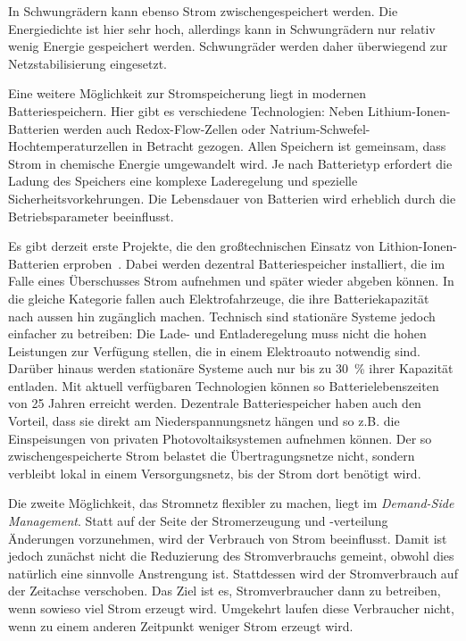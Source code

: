 \documentclass[12pt,BCOR=8.5mm]{scrartcl}
\begin{document}
In Schwungrädern kann ebenso Strom zwischengespeichert werden. Die
Energiedichte ist hier sehr hoch, allerdings kann in Schwungrädern nur
relativ wenig Energie gespeichert werden. Schwungräder werden daher
überwiegend zur Netzstabilisierung eingesetzt.

Eine weitere Möglichkeit zur Stromspeicherung liegt in modernen
Batteriespeichern. Hier gibt es verschiedene Technologien: Neben
Lithium-Ionen-Batterien werden auch Redox-Flow-Zellen oder
Natrium-Schwefel-Hochtemperaturzellen in Betracht gezogen. Allen
Speichern ist gemeinsam, dass Strom in chemische Energie umgewandelt
wird. Je nach Batterietyp erfordert die Ladung des Speichers eine
komplexe Laderegelung und spezielle Sicherheitsvorkehrungen. Die
Lebensdauer von Batterien wird erheblich durch die Betriebsparameter
beeinflusst.

Es gibt derzeit erste Projekte, die den
großtechnischen Einsatz von Lithion-Ionen-Batterien
erproben~\cite{braun09lithium}. Dabei werden dezentral Batteriespeicher
installiert, die im Falle eines Überschusses Strom aufnehmen und später
wieder abgeben können. In die gleiche Kategorie fallen auch
Elektrofahrzeuge, die ihre Batteriekapazität nach aussen hin zugänglich
machen. Technisch sind stationäre Systeme jedoch einfacher zu betreiben:
Die Lade- und Entladeregelung muss nicht die hohen Leistungen zur
Verfügung stellen, die in einem Elektroauto notwendig sind. Darüber
hinaus werden stationäre Systeme auch nur bis zu 30~\% ihrer Kapazität
entladen. Mit aktuell verfügbaren Technologien können so
Batterielebenszeiten von 25 Jahren erreicht werden. Dezentrale
Batteriespeicher haben auch den Vorteil, dass sie direkt am
Niederspannungsnetz hängen und so z.B. die Einspeisungen von privaten
Photovoltaiksystemen aufnehmen können. Der so zwischengespeicherte Strom
belastet die Übertragungsnetze nicht, sondern verbleibt lokal in einem
Versorgungsnetz, bis der Strom dort benötigt wird.

Die zweite Möglichkeit, das Stromnetz flexibler zu machen, liegt im \emph{Demand-Side
Management}. Statt auf der Seite der Stromerzeugung und -verteilung
Änderungen vorzunehmen, wird der Verbrauch von Strom beeinflusst. Damit
ist jedoch zunächst nicht die Reduzierung des Stromverbrauchs gemeint,
obwohl dies natürlich eine sinnvolle Anstrengung ist. Stattdessen wird
der Stromverbrauch auf der Zeitachse verschoben. Das Ziel ist es,
Stromverbraucher dann zu betreiben, wenn sowieso viel Strom erzeugt
wird. Umgekehrt laufen diese Verbraucher nicht, wenn zu einem anderen
Zeitpunkt weniger Strom erzeugt wird.
\end{document}
